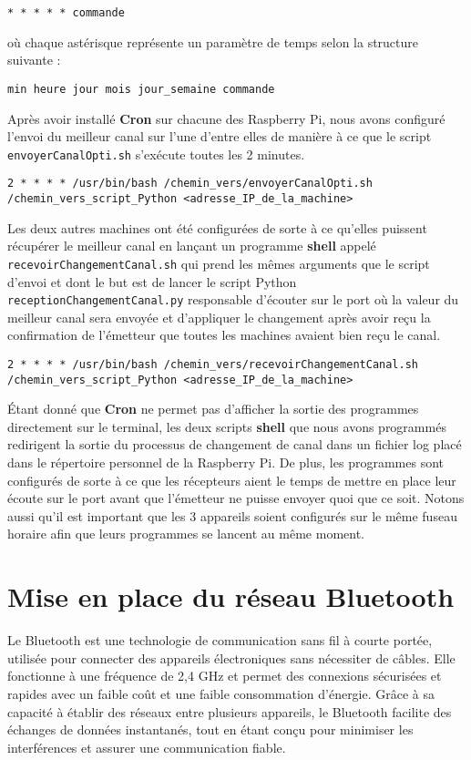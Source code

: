 \documentclass[a4paper,11pt]{article}
\begin{document}
\begin{center}
\texttt{* * * * * commande}
\end{center}

où chaque astérisque représente un paramètre de temps selon la structure suivante :

\begin{center}
\texttt{min heure jour mois jour\_semaine commande}
\end{center}

Après avoir installé \textbf{Cron} sur chacune des Raspberry Pi, nous avons configuré l'envoi du meilleur canal sur l'une d'entre elles de manière à ce que le script \texttt{envoyerCanalOpti.sh} s'exécute toutes les 2 minutes.

\begin{center}
\texttt{2 * * * * /usr/bin/bash /chemin\_vers/envoyerCanalOpti.sh /chemin\_vers\_script\_Python <adresse\_IP\_de\_la\_machine>}
\end{center}

Les deux autres machines ont été configurées de sorte à ce qu'elles puissent récupérer le meilleur canal en lançant un programme \textbf{shell} appelé \texttt{recevoirChangementCanal.sh} qui prend les mêmes arguments que le script d'envoi et dont le but est de lancer le script Python \texttt{receptionChangementCanal.py} responsable d'écouter sur le port où la valeur du meilleur canal sera envoyée et d'appliquer le changement après avoir reçu la confirmation de l'émetteur que toutes les machines avaient bien reçu le canal.

\begin{center}
\texttt{2 * * * * /usr/bin/bash /chemin\_vers/recevoirChangementCanal.sh /chemin\_vers\_script\_Python <adresse\_IP\_de\_la\_machine>}
\end{center}

Étant donné que \textbf{Cron} ne permet pas d'afficher la sortie des programmes directement sur le terminal, les deux scripts \textbf{shell} que nous avons programmés redirigent la sortie du processus de changement de canal dans un fichier log placé dans le répertoire personnel de la Raspberry Pi. De plus, les programmes sont configurés de sorte à ce que les récepteurs aient le temps de mettre en place leur écoute sur le port avant que l'émetteur ne puisse envoyer quoi que ce soit. Notons aussi qu'il est important que les 3 appareils soient configurés sur le même fuseau horaire afin que leurs programmes se lancent au même moment.


\section{Mise en place du réseau Bluetooth}
Le Bluetooth est une technologie de communication sans fil à courte portée, utilisée pour connecter des appareils électroniques sans nécessiter de câbles. Elle fonctionne à une fréquence de 2,4 GHz et permet des connexions sécurisées et rapides avec un faible coût et une faible consommation d'énergie. Grâce à sa capacité à établir des réseaux entre plusieurs appareils, le Bluetooth facilite des échanges de données instantanés, tout en étant conçu pour minimiser les interférences et assurer une communication fiable.
\end{document}
